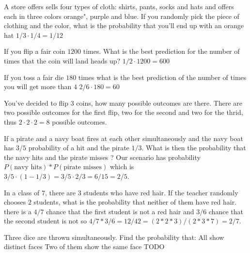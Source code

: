 \begin{ExerciseList}
\Exercise A store offers sells four types of cloth: shirts, pants, socks and hats and offers each in three colors orange", purple and blue. If you randomly pick the piece of clothing and the color, what is the probability that you'll end up with an orange hat
\Answer $1/3 \cdot 1/4 = 1/12$

\Exercise If you flip a fair coin $1200$ times. What is the best prediction for the number of times that the coin will land heads up?
\Answer $1/2 \cdot 1200 = 600$

\Exercise If you toss a fair die $180$ times what is the best prediction of the number of times you will get more than $4$
\Answer $2/6 \cdot 180 = 60$

\Exercise You've decided to flip $3$ coins, how many possible outcomes are there.
\Answer There are two possible outcomes for the first flip, two for the second and two for the thrid, thus $2 \cdot 2 \cdot 2 = 8$ possible outcomes.

\Exercise If a pirate and a navy boat fires at each other simultaneously and the navy boat has $3/5$ probability of a hit and the pirate $1/3$. What is then the probability that the navy hits and the pirate misses ?
\Answer Our scenario has probability $P(\text{navy hits}) * P(\text{pirate misses})$ which is $3/5 \cdot (1 - 1/3) = 3/5 \cdot 2/3 = 6/15 = 2/5$.

\Exercise In a class of $7$, there are $3$ students who have red hair. If the teacher randomly chooses $2$ students, what is the probability that neither of them have red hair.
\Answer there is a $4/7$ chance that the first student is not a red hair and $3/6$ chance that the second student is not so $4/7 * 3/6 = 12/42 = (2*2*3)/(2*3*7) = 2/7$.

\Exercise Three dice are thrown simultaneously. Find the probability that:
\Question All show distinct faces
\Question Two of them show the same face
\Answer TODO %

\end{ExerciseList}
